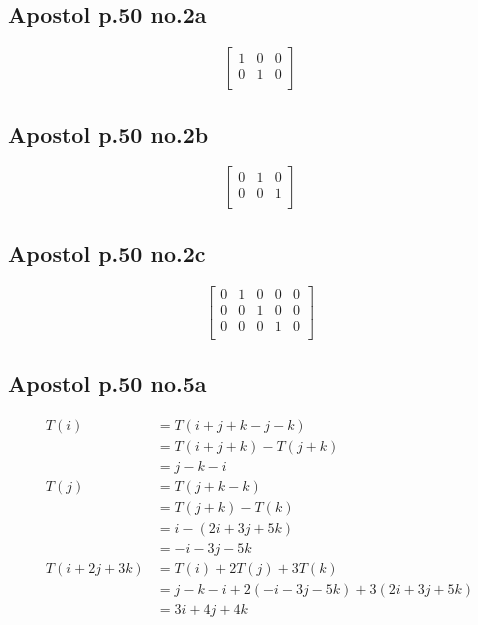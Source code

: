 \documentclass[12pt,letterpaper]{article}
\theoremstyle{definition}
\begin{document}
\subsection*{Apostol p.50 no.2a}

\[
  \begin{bmatrix}
    1 & 0 & 0 \\
    0 & 1 & 0 \\
  \end{bmatrix}
\]

\subsection*{Apostol p.50 no.2b}

\[
  \begin{bmatrix}
    0 & 1 & 0 \\
    0 & 0 & 1 \\
  \end{bmatrix}
\]

\subsection*{Apostol p.50 no.2c}

\[
  \begin{bmatrix}
    0 & 1 & 0 & 0 & 0\\
    0 & 0 & 1 & 0 & 0\\
    0 & 0 & 0 & 1 & 0\\
  \end{bmatrix}
\]

\subsection*{Apostol p.50 no.5a}

\begin{align*}
  T(i) &= T(i + j + k - j - k) \\
       &= T(i + j + k) - T(j + k) \\
       &= j - k - i \\
  T(j) &= T(j + k - k) \\
       &= T(j + k) - T(k) \\
       &= i - (2i + 3j + 5k) \\
       &= -i -3j -5k \\
  T(i + 2j + 3k) &= T(i) + 2T(j) + 3T(k) \\
       &= j -k -i + 2(-i -3j -5k) + 3(2i + 3j + 5k) \\
       &= 3i + 4j + 4k
\end{align*}
\end{document}
